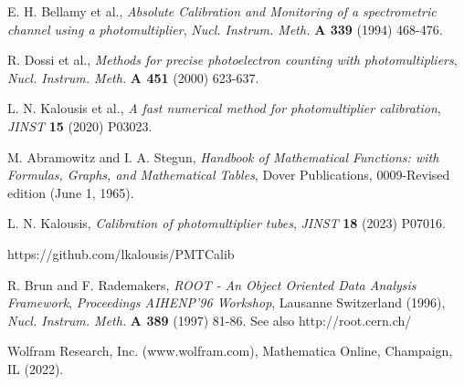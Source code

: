 \documentclass[preprint,12pt]{elsarticle}
\begin{document}
\begin{thebibliography}{00}


 E. H. Bellamy {et al.}, \emph{Absolute Calibration and Monitoring of a spectrometric channel using a photomultiplier}, 
\emph{Nucl. Instrum. Meth.} {\bf A 339} (1994) 468-476. 

  R. Dossi {et al.}, \emph{Methods for precise photoelectron counting with photomultipliers}, 
\emph{Nucl. Instrum. Meth.} {\bf A 451} (2000) 623-637.

 L. N. Kalousis {et al.}, \emph{A fast numerical method for photomultiplier calibration}, \emph{JINST} {\bf 15} (2020) P03023.

 M. Abramowitz and I. A. Stegun, \emph{Handbook of Mathematical Functions: with Formulas, Graphs, and Mathematical Tables}, Dover Publications, 0009-Revised edition (June 1, 1965).  

 L. N. Kalousis, \emph{Calibration of photomultiplier tubes}, \emph{JINST} {\bf 18} (2023) P07016.

 https://github.com/lkalousis/PMTCalib

 R. Brun and F. Rademakers, \emph{ROOT - An Object Oriented Data Analysis Framework}, \emph{Proceedings AIHENP'96 Workshop}, Lausanne Switzerland (1996),
{\emph{Nucl. Instrum. Meth.} {\bf A 389 } (1997) 81-86.} See also http://root.cern.ch/

 Wolfram Research, Inc. (www.wolfram.com), Mathematica Online, Champaign, IL (2022).


\end{thebibliography}
\end{document}
